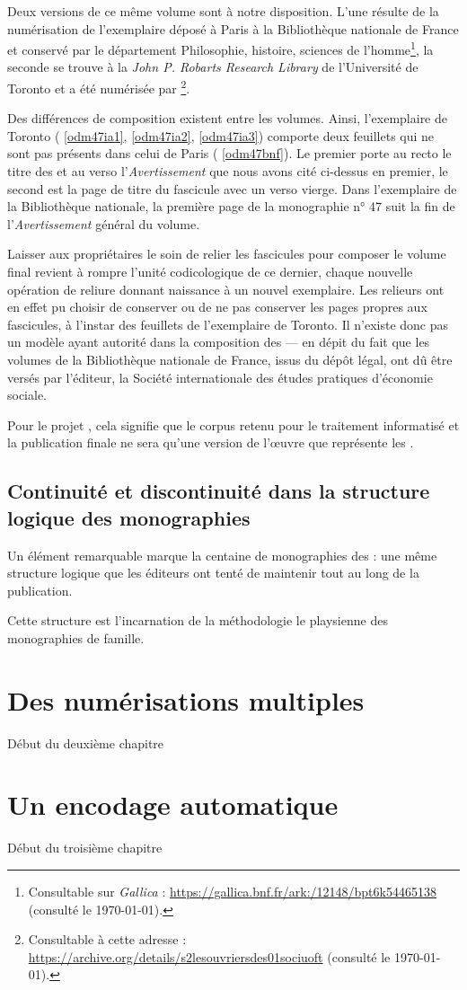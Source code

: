 Deux versions de ce même volume sont à notre disposition. L'une résulte de la numérisation de l'exemplaire déposé à Paris à la Bibliothèque nationale de France et conservé par le département Philosophie, histoire, sciences de l'homme\footnote{Consultable sur \textit{Gallica} : \url{https://gallica.bnf.fr/ark:/12148/bpt6k54465138} (consulté le \today).}, la seconde se trouve à la \textit{John P. Robarts Research Library} de l'Université de Toronto et a été numérisée par \ia\footnote{Consultable à cette adresse : \url{https://archive.org/details/s2lesouvriersdes01sociuoft} (consulté le \today).}.

Des différences de composition existent entre les volumes. Ainsi, l'exemplaire de Toronto (\fig{} \ref{odm47ia1}, \ref{odm47ia2}, \ref{odm47ia3}) comporte deux feuillets qui ne sont pas présents dans celui de Paris (\fig{} \ref{odm47bnf}). Le premier porte au recto le titre des \odm{} et au verso l'\textit{Avertissement} que nous avons cité ci-dessus en premier, le second est la page de titre du fascicule avec un verso vierge. Dans l'exemplaire de la Bibliothèque nationale, la première page de la monographie n° 47 suit la fin de l'\textit{Avertissement} général du volume.

Laisser aux propriétaires le soin de relier les fascicules pour composer le volume final revient à rompre l'unité codicologique de ce dernier, chaque nouvelle opération de reliure donnant naissance à un nouvel exemplaire. Les relieurs ont en effet pu choisir de conserver ou de ne pas conserver les pages propres aux fascicules, à l'instar des feuillets de l'exemplaire de Toronto. Il n'existe donc pas un modèle ayant autorité dans la composition des \odm{} --- en dépit du fait que les volumes de la Bibliothèque nationale de France, issus du dépôt légal, ont dû être versés par l'éditeur, \cad{} la Société internationale des études pratiques d'économie sociale.

Pour le projet \timeus{}, cela signifie que le corpus retenu pour le traitement informatisé et la publication finale ne sera qu'une version de l'\oe{}uvre que représente les \odm.

\section{Continuité et discontinuité dans la structure logique des monographies}

Un élément remarquable marque la centaine de monographies des \odm{} : une même structure logique que les éditeurs ont tenté de maintenir tout au long de la publication.

Cette structure est l'incarnation de la méthodologie le playsienne des monographies de famille.

\chapter{Des numérisations multiples}

Début du deuxième chapitre

\chapter{Un encodage automatique}

Début du troisième chapitre